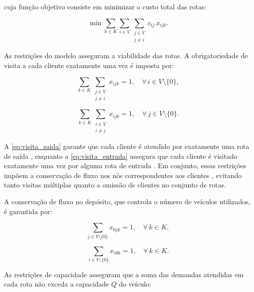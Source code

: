 \noindent cuja função objetivo consiste em minimizar o custo total das rotas:

\begin{equation}
    \min \sum_{k \in K} \sum_{i \in V} \sum_{\substack{j \in V \\ j \neq i}} 
    c_{ij}\, x_{ijk}.
    \label{eq:fo_vrp}
\end{equation}

As restrições do modelo asseguram a viabilidade das rotas. A obrigatoriedade de visita a cada cliente exatamente uma vez é imposta por:

\begin{equation}
    \sum_{k \in K} \sum_{\substack{j \in V \\ j \neq i}} x_{ijk} = 1, 
    \quad \forall\, i \in V \setminus \{0\},
    \label{eq:visita_saida}
\end{equation}

\begin{equation}
    \sum_{k \in K} \sum_{\substack{i \in V \\ i \neq j}} x_{ijk} = 1, 
    \quad \forall\, j \in V \setminus \{0\}.
    \label{eq:visita_entrada}
\end{equation}

A \autoref{eq:visita_saida} garante que cada cliente é atendido por exatamente uma rota de saída \cite{clarke1964scheduling}, enquanto a \autoref{eq:visita_entrada} assegura que cada cliente é visitado exatamente uma vez por alguma rota de entrada \cite{toth2014vehicle}. Em conjunto, essas restrições impõem a conservação de fluxo nos nós correspondentes aos clientes \cite{Fisher1995}, evitando tanto visitas múltiplas quanto a omissão de clientes no conjunto de rotas.

A conservação de fluxo no depósito, que controla o número de veículos utilizados, é garantida por:

\begin{equation}
    \sum_{j \in V \setminus \{0\}} x_{0jk} = 1, \quad \forall\, k \in K,
    \label{eq:fluxo_saida}
\end{equation}

\begin{equation}
    \sum_{i \in V \setminus \{0\}} x_{i0k} = 1, \quad \forall\, k \in K.
    \label{eq:fluxo_entrada}
\end{equation}

As restrições de capacidade asseguram que a soma das demandas atendidas em cada rota não exceda a capacidade $Q$ do veículo:

